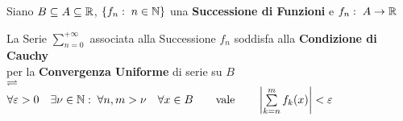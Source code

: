 \begin{definition}
	Siano $B \subseteq A \subseteq \mathbb{R}$, $\left\{f_n:\; n \in \mathbb{N}\right\}$ una \textbf{Successione di Funzioni} e $f_n:\; A \to \mathbb{R}$
	\begin{center}
		La Serie $\sum\limits_{n = 0}^{+\infty}$ associata alla Successione $f_n$ soddisfa alla \textbf{Condizione di Cauchy}\\
		per la \textbf{Convergenza Uniforme} di serie su $B$\\
		$\rightleftharpoons$\\
		$
			\forall \varepsilon > 0 \quad \exists \nu \in \N:\; \forall n, m > \nu \quad \forall x \in B %
			\qquad \text{vale} \qquad \abs{ \sum\limits_{k = n}^{m} f_k(x) } < \varepsilon
		$
	\end{center}
\end{definition}

